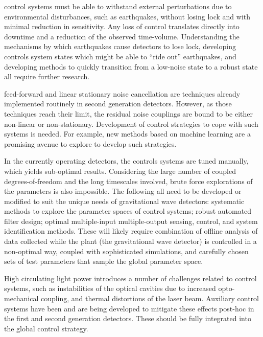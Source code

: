 {} control systems must be able to withstand external perturbations due to environmental disturbances, such as earthquakes, without losing lock and with minimal reduction in sensitivity. Any loss of control translates directly into downtime and a reduction of the observed time-volume. Understanding the mechanisms by which earthquakes cause detectors to lose lock, developing controls system states which might be able to ``ride out'' earthquakes, and developing methods to quickly transition from a low-noise state to a robust state all require further research.\par
{} feed-forward and linear stationary noise cancellation are techniques already implemented routinely in second generation detectors. However, as those techniques reach their limit, the residual noise couplings are bound to be either non-linear or non-stationary. Development of control strategies to cope with such systems is needed. For example, new methods based on machine learning are a promising avenue to explore to develop such strategies.\par
{} In the currently operating detectors, the controls systems are tuned manually, which yields sub-optimal results.  Considering the large number of coupled degrees-of-freedom and the long timescales involved, brute force explorations of the parameters is also impossible. The following all need to be developed or modified to suit the unique needs of gravitational wave detectors: systematic methods to explore the parameter spaces of control systems; robust automated filter design; optimal multiple-input multiple-output sensing, control, and system identification methods. These will likely require combination of offline analysis of data collected while the plant (the gravitational wave detector) is controlled in a non-optimal way, coupled with sophisticated simulations, and carefully chosen sets of test parameters that sample the global parameter space.
\par
{}
High circulating light power introduces a number of challenges related to control systems, such as instabilities of the optical cavities due to increased opto-mechanical coupling, and thermal distortions of the laser beam. Auxiliary control systems have been and are being developed to mitigate these effects post-hoc in the first and second generation detectors. These should be fully integrated into the global control strategy.
